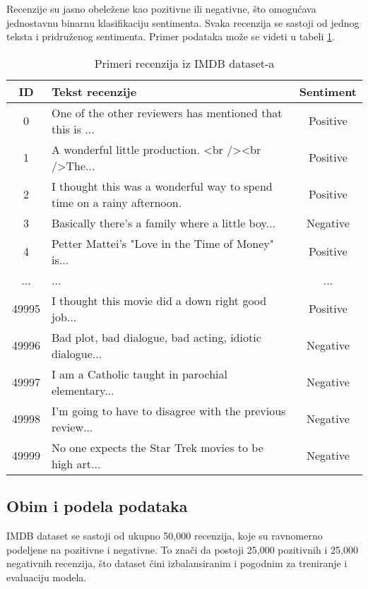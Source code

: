 \documentclass{article}
\begin{document}
Recenzije su jasno obeležene kao pozitivne ili negativne, što omogućava jednostavnu binarnu klasifikaciju sentimenta. Svaka recenzija se sastoji od jednog teksta i pridruženog sentimenta. Primer podataka može se videti u tabeli \ref{tab:imdb_primeri}.

\begin{table}[h!]
\centering
\begin{tabular}{|c|p{10cm}|c|}
\hline
\textbf{ID} & \textbf{Tekst recenzije} & \textbf{Sentiment} \\ \hline
0 & One of the other reviewers has mentioned that this is ... & Positive \\ \hline
1 & A wonderful little production. <br /><br />The... & Positive \\ \hline
2 & I thought this was a wonderful way to spend time on a rainy afternoon. & Positive \\ \hline
3 & Basically there's a family where a little boy... & Negative \\ \hline
4 & Petter Mattei's "Love in the Time of Money" is... & Positive \\ \hline
... & ... & ... \\ \hline
49995 & I thought this movie did a down right good job... & Positive \\ \hline
49996 & Bad plot, bad dialogue, bad acting, idiotic dialogue... & Negative \\ \hline
49997 & I am a Catholic taught in parochial elementary... & Negative \\ \hline
49998 & I'm going to have to disagree with the previous review... & Negative \\ \hline
49999 & No one expects the Star Trek movies to be high art... & Negative \\ \hline
\end{tabular}
\caption{Primeri recenzija iz IMDB dataset-a}
\label{tab:imdb_primeri}
\end{table}

\subsection{Obim i podela podataka}

IMDB dataset se sastoji od ukupno 50,000 recenzija, koje su ravnomerno podeljene na pozitivne i negativne. To znači da postoji 25,000 pozitivnih i 25,000 negativnih recenzija, što dataset čini izbalansiranim i pogodnim za treniranje i evaluaciju modela. 


\newpage
\end{document}
